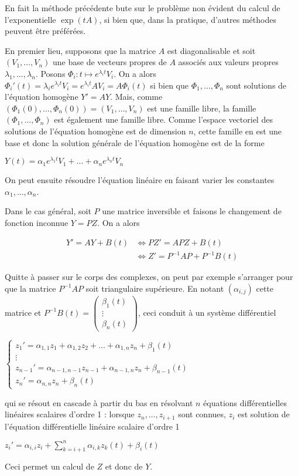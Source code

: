 En fait la méthode précédente bute sur le problème non évident du calcul
de l'exponentielle $\exp(tA)$, si bien que, dans
la pratique, d'autres méthodes peuvent être préférées.

En premier lieu, supposons que la matrice $A$ est diagonalisable et soit
$(V_1,\ldots,V_n)$ une base de vecteurs propres de $A$ associés aux valeurs
propres
$\lambda_1,\ldots,\lambda_n$.
Posons $\Phi_i : t \mapsto e^{\lambda_i t}V_i$. On
a alors $\Phi_i'(t) = \lambda_i e^{\lambda_i t}V_i = e^{\lambda_i t}AV_i = A\Phi_i(t)$
si bien que
$\Phi_1,\ldots,\Phi_n$
sont solutions de l'équation homogène $Y' = AY$. Mais, comme
$(\Phi_1(0),\ldots,\Phi_n(0)) = (V_1,\ldots,V_n)$ est une famille libre, la famille
$(\Phi_1,\ldots,\Phi_n)$
est également une famille libre. Comme l'espace vectoriel des solutions
de l'équation homogène est de dimension $n$, cette famille en est une base
et donc la solution générale de l'équation homogène est de la forme

$Y(t) = \alpha_1 e^{\lambda_1 t}V_1 + \ldots + \alpha_n e^{\lambda_n t}V_n$

On peut ensuite résoudre l'équation linéaire en faisant varier les
constantes
$\alpha_1,\ldots,\alpha_n$.

Dans le cas général, soit $P$ une matrice inversible et faisons le
changement de fonction inconnue $Y = PZ$. On a alors

\begin{align*} 
Y' = AY + B(t) &\Leftrightarrow PZ' = APZ + B(t) \\
&\Leftrightarrow Z' = P^{-1}AP + P^{-1}B(t)
\end{align*}

Quitte à passer sur le corps des complexes, on peut par exemple
s'arranger pour que la matrice $P^{-1}AP$ soit triangulaire
supérieure. En notant $(\alpha_{i,j})$ cette matrice et
$P^{-1}B(t) = \begin{pmatrix} \beta_1(t) \\ \vdots \\ \beta_n(t) \end{pmatrix}$, ceci conduit à un système différentiel

$\begin{cases}
z_1' = \alpha_{1,1}z_1 + \alpha_{1,2}z_2 + \ldots + \alpha_{1,n}z_n + \beta_1(t) \\
\vdots \\
z_{n-1}' = \alpha_{n-1,n-1}z_{n-1} + \alpha_{n-1,n}z_n + \beta_{n-1}(t) \\
z_n' = \alpha_{n,n}z_n + \beta_n(t)
\end{cases}$

qui se résout en cascade à partir du bas en résolvant $n$ équations
différentielles linéaires scalaires d'ordre 1 : lorsque
$z_n,\ldots,z_{i+1}$
sont connues, $z_i$ est solution de l'équation différentielle
linéaire scalaire d'ordre 1

$z_i' = \alpha_{i,i}z_i + \sum_{k=i+1}^n \alpha_{i,k}z_k(t) + \beta_i(t)$

Ceci permet un calcul de $Z$ et donc de $Y$.